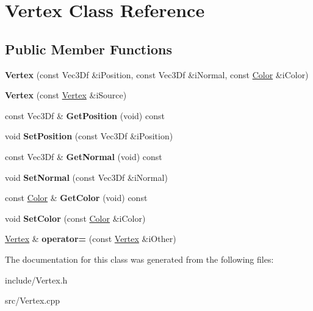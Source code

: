 \hypertarget{classVertex}{\section{Vertex Class Reference}
\label{classVertex}
}
\subsection*{Public Member Functions}
\begin{DoxyCompactItemize}
\item 
\hypertarget{classVertex_a504e70cf5ba206c9993e2607b1624a52}{{\bfseries Vertex} (const Vec3\-Df \&i\-Position, const Vec3\-Df \&i\-Normal, const \hyperlink{classColor}{Color} \&i\-Color)}\label{classVertex_a504e70cf5ba206c9993e2607b1624a52}

\item 
\hypertarget{classVertex_ac56047ebd95d68219aaba429c09fa8f9}{{\bfseries Vertex} (const \hyperlink{classVertex}{Vertex} \&i\-Source)}\label{classVertex_ac56047ebd95d68219aaba429c09fa8f9}

\item 
\hypertarget{classVertex_aaaada27aeeb4f2f59e582ccb45a50ccf}{const Vec3\-Df \& {\bfseries Get\-Position} (void) const }\label{classVertex_aaaada27aeeb4f2f59e582ccb45a50ccf}

\item 
\hypertarget{classVertex_ac14e14c70dd47dac0c58e1daf244678d}{void {\bfseries Set\-Position} (const Vec3\-Df \&i\-Position)}\label{classVertex_ac14e14c70dd47dac0c58e1daf244678d}

\item 
\hypertarget{classVertex_a938df0cb26391aa7b29d3d8aa277c838}{const Vec3\-Df \& {\bfseries Get\-Normal} (void) const }\label{classVertex_a938df0cb26391aa7b29d3d8aa277c838}

\item 
\hypertarget{classVertex_a48c5918cc1e9f9f71a0dfb034295eb4f}{void {\bfseries Set\-Normal} (const Vec3\-Df \&i\-Normal)}\label{classVertex_a48c5918cc1e9f9f71a0dfb034295eb4f}

\item 
\hypertarget{classVertex_aa1489f63adac0a774ebac33253d1b96a}{const \hyperlink{classColor}{Color} \& {\bfseries Get\-Color} (void) const }\label{classVertex_aa1489f63adac0a774ebac33253d1b96a}

\item 
\hypertarget{classVertex_a5f22b2cbc3d5a79717370d4fe2ce1144}{void {\bfseries Set\-Color} (const \hyperlink{classColor}{Color} \&i\-Color)}\label{classVertex_a5f22b2cbc3d5a79717370d4fe2ce1144}

\item 
\hypertarget{classVertex_a143617fec9c2c3676e23fbdf50c821e7}{\hyperlink{classVertex}{Vertex} \& {\bfseries operator=} (const \hyperlink{classVertex}{Vertex} \&i\-Other)}\label{classVertex_a143617fec9c2c3676e23fbdf50c821e7}

\end{DoxyCompactItemize}


The documentation for this class was generated from the following files\-:\begin{DoxyCompactItemize}
\item 
include/Vertex.\-h\item 
src/Vertex.\-cpp\end{DoxyCompactItemize}
